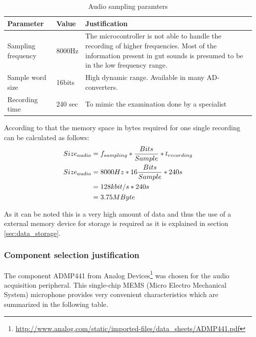 \begin{table}[htb]
\centering
\begin{tabular}{|l|l|m{8cm}|}
\hline
	\textbf{Parameter} &
	\textbf{Value} &
	\textbf{Justification} \\
\hline
	Sampling frequency &
	8000Hz &
	The microcontroller is not able to handle the recording of higher frequencies.
	Most of the information present in gut sounds is presumed to be in the low frequency range. \\
\hline
	Sample word size &
	16bits &
	High dynamic range. Available in many AD-converters. \\
\hline
	Recording time &
	240 sec &
	To mimic the examination done by a specialist \\
\hline
\end{tabular}
\caption{Audio sampling paramters}
\label{tab:sampling_parameters}
\end{table}

According to that the memory space in bytes required for one single recording can be calculated as follows:
\begin{align*}
\centering
Size_{audio}&=f_{sampling} * \frac{Bits}{Sample}* t_{recording} \\
Size_{audio}&=8000 Hz * 16 \frac{Bits}{Sample}* 240s \\
&= 128kbit/s * 240s \\
&= 3.75MByte
\end{align*}

As it can be noted this is a very high amount of data and thus the use of a external memory device for storage is required as it is explained in section \ref{sec:data_storage}.

\subsubsection{Component selection justification}
The component ADMP441 from Analog Devices\footnote{\url{http://www.analog.com/static/imported-files/data_sheets/ADMP441.pdf}} was chosen for the audio acquisition peripheral. This single-chip MEMS (Micro Electro Mechanical System) microphone provides very convenient characteristics which are summarized in the following table.

